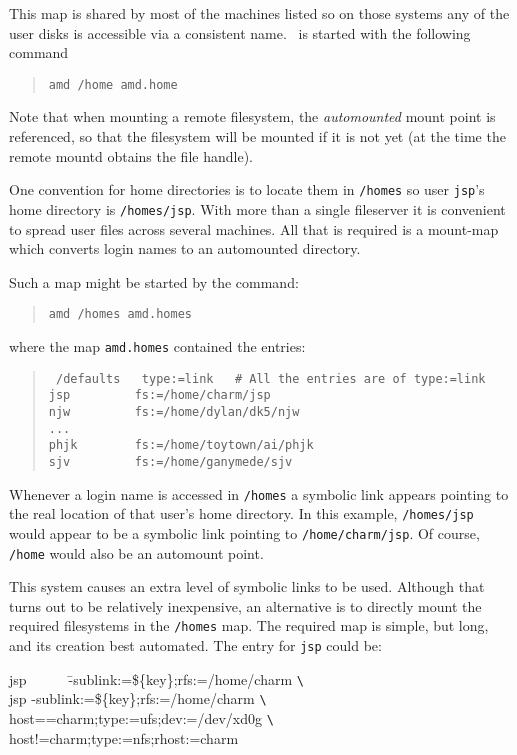This map is shared by most of the machines listed so on those
systems any of the user disks is accessible via a consistent name.
\Amd\ is started with the following command
\begin{quote}
\tt amd /home amd.home
\end{quote}

Note that when mounting a remote filesystem, the {\em automounted}
mount point is referenced, so that the filesystem will be mounted if
it is not yet (at the time the remote mountd obtains the file handle).

One convention for home directories is to locate them in {\tt /homes} so
user {\tt jsp}'s home directory is {\tt /homes/jsp}.
With more than a single fileserver it is convenient
to spread user files across several machines.
All that is required is a mount-map
which converts login names to an automounted directory.

Such a map might be started by the command:
\begin{quote}
\tt amd /homes amd.homes
\end{quote}
where the map {\tt amd.homes} contained the entries:
\begin{quote}\raggedright
\tt
/defaults\ \ \ type:=link\ \ \ \# All the entries are of type:=link \\
jsp\ \ \ \ \ \ \ \ \ fs:=/home/charm/jsp\\
njw\ \ \ \ \ \ \ \ \ fs:=/home/dylan/dk5/njw\\
...\\
phjk\ \ \ \ \ \ \ \ fs:=/home/toytown/ai/phjk\\
sjv\ \ \ \ \ \ \ \ \ fs:=/home/ganymede/sjv
\end{quote}
Whenever a login name is accessed in {\tt /homes} a symbolic link
appears pointing to the real location of that user's home directory.
In this example, {\tt /homes/jsp} would appear to be a symbolic link
pointing to {\tt /home/charm/jsp}.
Of course, {\tt /home} would also be an automount point.

This system causes an extra level of symbolic links to be used.
Although that turns out to be relatively inexpensive, an alternative is
to directly mount the required filesystems in the {\tt /homes}
map.  The required map is simple, but long, and its creation best automated.
The entry for {\tt jsp} could be:
{\tt\begin{tabbing}
jsp\ \ \ \ \ \ \= -sublink:=\$\{key\};rfs:=/home/charm {\verb+\+}\kill \\
jsp            \> -sublink:=\$\{key\};rfs:=/home/charm {\verb+\+}\\
               \> host==charm;type:=ufs;dev:=/dev/xd0g {\verb+\+}\\
               \> host!=charm;type:=nfs;rhost:=charm
\end{tabbing}}

